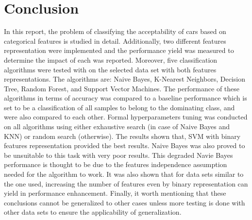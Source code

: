 \documentclass{article}
\begin{document}
\section{Conclusion}
In this report, the problem of classifying the acceptability of cars based on categorical features is studied in detail. Additionally, two different features representation were implemented and the performance yield was measured to determine the impact of each was reported. Moreover, five classification algorithms were tested with on the selected data set with both features representations. The algorithms are: Naive Bayes, K-Nearest Neighbors, Decision Tree, Random Forest, and Support Vector Machines. The performance of these algorithms in terms of accuracy was compared to a baseline performance which is set to be a classification of all samples to belong to the dominating class, and were also compared to each other. Formal hyperparameters tuning was conducted on all algorithms using either exhaustive search (in case of Naive Bayes and KNN) or random search (otherwise). The results shown that, SVM with binary features representation provided the best results. Naive Bayes was also proved to be unsuitable to this task with very poor results. This degraded Navie Bayes performance is thought to be due to the features independence assumption needed for the algorithm to work. It was also shown that for data sets similar to the one used, increasing the number of features even by binary representation can yield in performance enhancement. Finally, it worth mentioning that these conclusions cannot be generalized to other cases unless more testing is done with other data sets to ensure the applicability of generalization.

\end{document}

